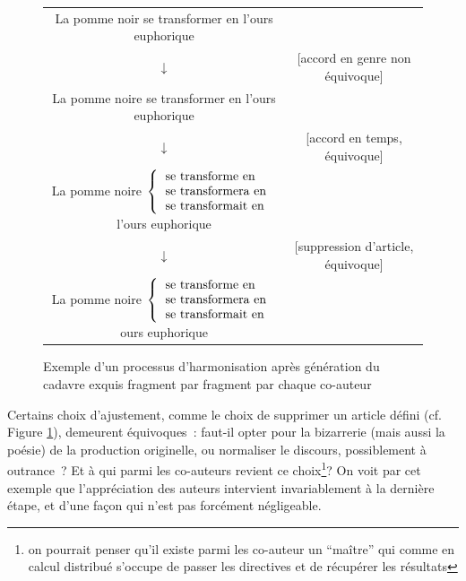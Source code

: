 \documentclass{article}
\begin{document}
				\begin{figure}
					\begin{tabular}{c c}
						La pomme noir se transformer en l'ours euphorique & \\
						$\downarrow$ & [accord en genre non équivoque] \\
						La pomme noire se transformer en l'ours euphorique & \\
						$\downarrow$ & [accord en temps, équivoque]\\
						La pomme noire $\left\lbrace\begin{tabular}{l}
							se transforme en\\
							se transformera en\\
							se transformait en\\
						\end{tabular}\right.$
						l'ours euphorique & \\
						$\downarrow$ & [suppression d'article, équivoque]\\
						La pomme noire 
						$\left\lbrace\begin{tabular}{l}
							se transforme en\\
							se transformera en\\
							se transformait en\\
						\end{tabular}\right.$ ours euphorique & \\
					\end{tabular}
					\caption{Exemple d'un processus d'harmonisation après génération du cadavre exquis fragment par fragment par chaque co-auteur}
					\label{fig:consensus}
				\end{figure}
				
				Certains choix d'ajustement, comme le choix de supprimer un article défini (cf. Figure \ref{fig:consensus}), demeurent équivoques~: faut-il opter pour la bizarrerie (mais aussi la poésie) de la production originelle, ou normaliser le discours, possiblement à outrance~? Et à qui parmi les co-auteurs revient ce choix\footnote{on pourrait penser qu'il existe parmi les co-auteur un ``maître'' qui comme en calcul distribué s'occupe de passer les directives et de récupérer les résultats}? On voit par cet exemple que l'appréciation des auteurs intervient invariablement à la dernière étape, et d'une façon qui n'est pas forcément négligeable.\\
				
\end{document}
